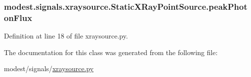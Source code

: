 \subsubsection[{\texorpdfstring{peak\+Photon\+Flux}{peakPhotonFlux}}]{\setlength{\rightskip}{0pt plus 5cm}modest.\+signals.\+xraysource.\+Static\+X\+Ray\+Point\+Source.\+peak\+Photon\+Flux}\hypertarget{classmodest_1_1signals_1_1xraysource_1_1StaticXRayPointSource_a45c2430decc163480da7732af27d1f99}{}\label{classmodest_1_1signals_1_1xraysource_1_1StaticXRayPointSource_a45c2430decc163480da7732af27d1f99}


Definition at line 18 of file xraysource.\+py.



The documentation for this class was generated from the following file\+:\begin{DoxyCompactItemize}
\item 
modest/signals/\hyperlink{xraysource_8py}{xraysource.\+py}\end{DoxyCompactItemize}
